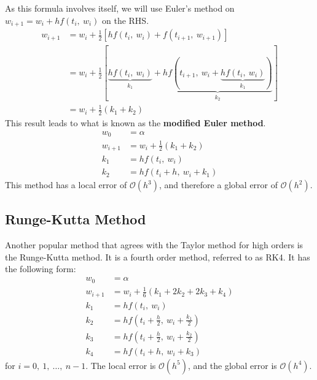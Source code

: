 \documentclass{article}
\begin{document}
As this formula involves itself, we will use Euler's method on
\(w_{i + 1} = w_i + h f\left( t_i,\: w_i \right)\) on the RHS\@.
\begin{align*}
    w_{i + 1} & = w_i + \frac{1}{2} \left[ h f\left( t_i,\: w_i \right) + f\left( t_{i + 1},\: w_{i + 1} \right) \right]                                                                                     \\
              & = w_i + \frac{1}{2} \left[ \underbrace{h f\left( t_i,\: w_i \right)}_{k_1} + \underbrace{h f\left( t_{i + 1},\: w_i + \underbrace{h f\left( t_i,\: w_i \right)}_{k_1} \right)}_{k_2} \right] \\
              & = w_i + \frac{1}{2} \left( k_1 + k_2 \right)
\end{align*}
This result leads to what is known as the \textbf{modified Euler method}.
\begin{align*}
    w_0       & = \alpha                                     \\
    w_{i + 1} & = w_i + \frac{1}{2} \left( k_1 + k_2 \right) \\
    k_1       & = h f\left( t_i,\: w_i \right)               \\
    k_2       & = h f\left( t_i + h,\: w_i + k_1 \right)
\end{align*}
This method has a local error of \(\mathcal{O}\left( h^3 \right)\), and
therefore a global error of \(\mathcal{O}\left( h^2 \right)\).
\subsection{Runge-Kutta Method}
Another popular method that agrees with the Taylor method for high
orders is the Runge-Kutta method. It is a fourth order method, referred
to as RK4. It has the following form:
\begin{align*}
    w_0       & = \alpha                                                     \\
    w_{i + 1} & = w_i + \frac{1}{6} \left( k_1 + 2 k_2 + 2 k_3 + k_4 \right) \\
    k_1       & = h f\left( t_i,\: w_i \right)                               \\
    k_2       & = h f\left( t_i + \frac{h}{2},\: w_i + \frac{k_1}{2} \right) \\
    k_3       & = h f\left( t_i + \frac{h}{2},\: w_i + \frac{k_2}{2} \right) \\
    k_4       & = h f\left( t_i + h,\: w_i + k_3 \right)
\end{align*}
for \(i = 0,\: 1,\: \ldots,\: n - 1\). The local error is
\(\mathcal{O}\left( h^5 \right)\), and the global error is
\(\mathcal{O}\left( h^4 \right)\).
\end{document}
